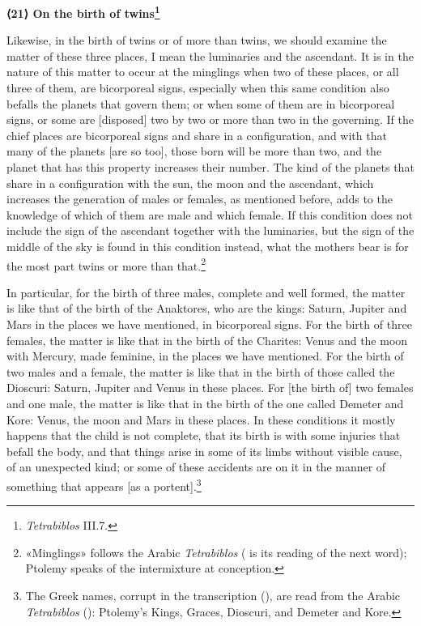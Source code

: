 \documentclass[11pt]{article}
\newcommand{\Fol}[1]{\marginpar{\footnotesize\color{gray}f.\,#1}}
\newcommand{\ChapterHead}[4]{\par\needspace{8\baselineskip}\bigskip\pdfbookmark[1]{#1}{ch-#2}\hypertarget{EN-K#2}{}%
 {\large\bfseries\interlinepenalty=10000 #1#4{\normalfont\normalsize#3}\par}\nobreak\medskip}
\begin{document}
\ChapterHead{{\mdseries ⟨}21{\mdseries ⟩} On the birth of twins}{21}{}{\footnote{\emph{Tetrabiblos} III.7.}}
\par \Fol{41v}Likewise, in the birth of twins or of more than twins, we should examine the matter of these three places, I mean the luminaries and the ascendant. It is in the nature of this matter to occur at the minglings when two of these places, or all three of them, are bicorporeal signs, especially when this same condition also befalls the planets that govern them; or when some of them are in bicorporeal signs, or some are [disposed] two by two or more than two in the governing. If the chief places are bicorporeal signs and share in a configuration, and with that many of the planets [are so too], those born will be more than two, and the planet that has this property increases their number. The kind of the planets that share in a configuration with the sun, the moon and the ascendant, which increases the generation of males or females, as mentioned before, adds to the knowledge of which of them are male and which female. If this condition does not include the sign of the ascendant together with the luminaries, but the sign of the middle of the sky is found in this condition instead, what the mothers bear is for the most part twins or more than that.\footnote{«Minglings» follows the Arabic \emph{Tetrabiblos} ( is its reading of the next word); Ptolemy speaks of the intermixture at conception.}\par
\par In particular, for the birth of three males, complete and well formed, the matter is like that of the birth of the Anaktores, who are the kings: Saturn, Jupiter and Mars in the places we have mentioned, in bicorporeal signs. For the birth of three females, the matter is like that in the birth of the Charites: Venus and the moon with Mercury, made feminine, in the places we have mentioned. For the birth of two males and a female, the matter is like that in the birth of those called the Dioscuri: Saturn, Jupiter and Venus in these places. For [the birth of] two females and one male, the matter is like that in the birth of the one called Demeter and Kore: Venus, the moon and Mars in these places. In these conditions it mostly happens that the child is not complete, that its birth is with some injuries that befall the body, and that things arise in some of its limbs without visible cause, of an unexpected kind; or some of these accidents are on it in the manner of something that appears [as a portent].\footnote{The Greek names, corrupt in the transcription (), are read from the Arabic \emph{Tetrabiblos} (): Ptolemy's Kings, Graces, Dioscuri, and Demeter and Kore.}\par
\end{document}
